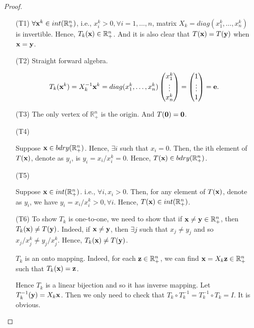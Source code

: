 \documentclass[12pt]{article}
\begin{document}
\begin{proof}

\begin{enumerate}
\item [(T1)]
$\forall \textbf x^k \in int(\mathbb R^n_+)$, i.e., $x^k_i >0, \forall i = 1, \dots, n$, matrix $X_k = diag(x^k_1, \dots, x^k_n)$ is invertible. Hence, $T_k(\textbf x) \in \mathbb R^n_+$. And it is also clear that $T(\textbf x) = T(\textbf y)$ when $ \textbf x = \textbf y$.

\item [(T2)]
Straight forward algebra. 

$$
T_k(\textbf x^k) = X_k^{-1}\textbf x^k = diag(x^k_1, \dots, x_n^k) \begin{pmatrix}
x^k_1 \\ \vdots \\ x^k_n
\end{pmatrix} = 
\begin{pmatrix}
1 \\ \vdots \\ 1
\end{pmatrix} = \textbf e.
$$

\item [(T3)]
The only vertex of $\mathbb R^n_+$ is the origin. And $T(\textbf 0)= \textbf 0$.

\item [(T4)]

Suppose $\textbf x \in bdry(\mathbb R^n_+)$. Hence, $\exists i$ such that $x_i = 0$. Then, the ith element of $T(\textbf x)$, denote as $y_i$, is $y_i = x_i/x^k_i = 0$. Hence, $T(\textbf x)\in bdry(\mathbb R^n_+)$.

\item [(T5)]

Suppose $\textbf x \in int(\mathbb R^n_+)$. i.e., $\forall i, x_i > 0$. Then, for any element of $T(\textbf x)$, denote as $y_i$, we have $y_i = x_i/x^k_i > 0, \forall i$. Hence, $T(\textbf x)\in int(\mathbb R^n_+)$.

\item [(T6)]
To show $T_k$ is one-to-one, we need to show that if $\textbf x \neq \textbf y \in \mathbb R^n_+$, then $T_k(\textbf x) \neq T(\textbf y)$. Indeed, if $\textbf x \neq \textbf y$, then $\exists j$ such that $x_j \neq y_j$ and so $x_j/x^k_j \neq y_j/x^k_j$. Hence, $T_k(\textbf x) \neq T(\textbf y)$.

$T_k$ is an onto mapping. Indeed, for each $\textbf z \in \mathbb R^n_+$, we can find $\textbf x = X_k \textbf z \in \mathbb R^n_+$ such that $T_k(\textbf x) = \textbf z$. 

Hence $T_k$ is a linear bijection and so it has inverse mapping. Let $T^{-1}_k(\textbf y)= X_k\textbf x$. Then we only need to check that $T_k\circ T_k^{-1} = T_k^{-1} \circ T_k = I$. It is obvious.
 


\end{enumerate}



\end{proof}
\end{document}
